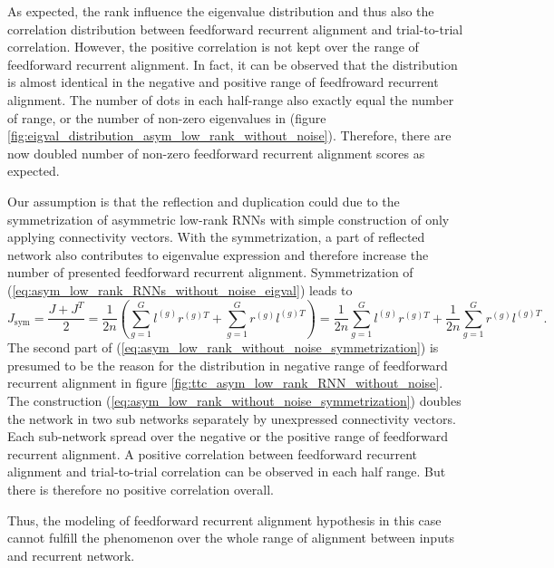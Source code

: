 \documentclass[11pt]{article}
\begin{document}
	As expected, the rank influence the eigenvalue distribution and thus also the correlation distribution between feedforward recurrent alignment and trial-to-trial correlation. However, the positive correlation is not kept over the range of feedforward recurrent alignment. In fact, it can be observed that the distribution is almost identical in the negative and positive range of feedfroward recurrent alignment. The number of dots in each half-range also exactly equal the number of range, or the number of non-zero eigenvalues in (figure \ref{fig:eigval_distribution_asym_low_rank_without_noise}). Therefore, there are now doubled number of non-zero feedforward recurrent alignment scores as expected. 
		
	Our assumption is that the reflection and duplication could due to the symmetrization of asymmetric low-rank RNNs with simple construction of only applying connectivity vectors. With the symmetrization, a part of reflected network also contributes to eigenvalue expression and therefore increase the number of presented feedforward recurrent alignment. Symmetrization of (\ref{eq:asym_low_rank_RNNs_without_noise_eigval}) leads to
		\begin{equation} \label{eq:asym_low_rank_without_noise_symmetrization}
			J_{\text{sym}} = \frac{J + J^T}{2} = \frac{1}{2n} \left( \sum_{g=1}^{G} l^{(g)} r^{(g)T} + \sum_{g=1}^{G} r^{(g)} l^{(g)T}\right) = \frac{1}{2n} \sum_{g=1}^{G} l^{(g)} r^{(g)T} + \frac{1}{2n} \sum_{g=1}^{G} r^{(g)} l^{(g)T} \, .
		\end{equation}
	The second part of (\ref{eq:asym_low_rank_without_noise_symmetrization}) is presumed to be the reason for the distribution in negative range of feedforward recurrent alignment in figure \ref{fig:ttc_asym_low_rank_RNN_without_noise}. The construction (\ref{eq:asym_low_rank_without_noise_symmetrization}) doubles the network in two sub networks separately by unexpressed connectivity vectors. Each sub-network spread over the negative or the positive range of feedforward recurrent alignment. A positive correlation between feedforward recurrent alignment and trial-to-trial correlation can be observed in each half range. But there is therefore no positive correlation overall. 
	
	Thus, the modeling of feedforward recurrent alignment hypothesis in this case cannot fulfill the phenomenon over the whole range of alignment between inputs and recurrent network. 
	
\end{document}
